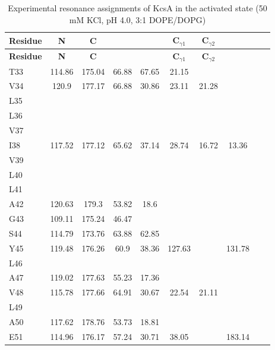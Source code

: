\documentclass[%
 aip,
 amsmath,amssymb,
 preprint,%
]{revtex4-1}
\newcommand{\ca}{\ce{C_\alpha} }
\newcommand{\cb}{\ce{C_\beta} }
\newcommand{\cd}{\ce{C_\delta} }
\newcommand{\cep}{\ce{C_\epsilon} }
\newcommand{\cz}{\ce{C_\zeta} }
\begin{document}
\endgroup



\begingroup
\begin{center}
\begin{longtable}{l|c|c|c|c|c|c|c|c|c}
\caption{\scriptsize Experimental resonance assignments of KcsA in the activated state (50 mM KCl, pH 4.0, 3:1 DOPE/DOPG)\label{SI_tb_activated_exp_CS}}\\ \hline \hline 
\textbf{Residue} & \textbf{N} & \textbf{C} & \textbf{\ca} & \textbf{\cb} & \textbf{C$_{\gamma1}$} & \textbf{C$_{\gamma2}$} & \textbf{\cd} & \textbf{\cep} & \textbf{\cz} \\ \hline
\endfirsthead 
\hline
\textbf{Residue} & \textbf{N} & \textbf{C} & \textbf{\ca} & \textbf{\cb} & \textbf{C$_{\gamma1}$} & \textbf{C$_{\gamma2}$} & \textbf{\cd} & \textbf{\cep} & \textbf{\cz} \\ \hline
\endhead
T33 & 114.86 & 175.04 & 66.88 & 67.65 & 21.15 & & & & \\ \hline
V34 & 120.9 & 177.17 & 66.88 & 30.86 & 23.11 & 21.28 & & & \\ \hline
L35 & & & & & & & & & \\ \hline
L36 & & & & & & & & & \\ \hline
V37 & & & & & & & & & \\ \hline
I38 & 117.52 & 177.12 & 65.62 & 37.14 & 28.74 & 16.72 & 13.36 & & \\ \hline
V39 & & & & & & & & & \\ \hline
L40 & & & & & & & & & \\ \hline
L41 & & & & & & & & & \\ \hline
A42 & 120.63 & 179.3 & 53.82 & 18.6 & & & & & \\ \hline
G43 & 109.11 & 175.24 & 46.47 & & & & & & \\ \hline
S44 & 114.79 & 173.76 & 63.88 & 62.85 & & & & & \\ \hline
Y45 & 119.48 & 176.26 & 60.9 & 38.36 & 127.63 & & 131.78 & & \\ \hline
L46 & & & & & & & & & \\ \hline
A47 & 119.02 & 177.63 & 55.23 & 17.36 & & & & & \\ \hline
V48 & 115.78 & 177.66 & 64.91 & 30.67 & 22.54 & 21.11 & & & \\ \hline
L49 & & & & & & & & & \\ \hline
A50 & 117.62 & 178.76 & 53.73 & 18.81 & & & & & \\ \hline
E51 & 114.96 & 176.17 & 57.24 & 30.71 & 38.05 & & 183.14 & & \\ \hline

\end{longtable}
\end{center}
\end{document}
